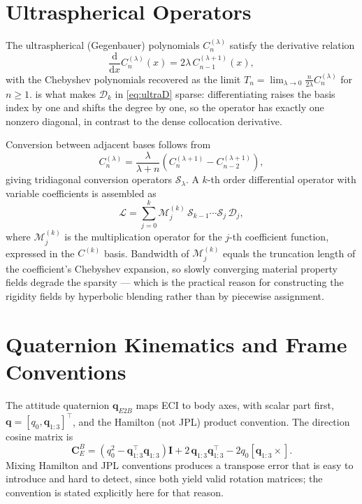 \documentclass[11pt,a4paper]{article}
\theoremstyle{definition}
\numberwithin{equation}{section}
\newcommand{\diff}{\mathrm{d}}
\begin{document}
\begin{appendices}

\section{Ultraspherical Operators}
\label{app:ultra}

The ultraspherical (Gegenbauer) polynomials $C_n^{(\lambda)}$ satisfy the derivative relation
\begin{equation}
\label{eq:ultraderiv}
\frac{\diff}{\diff x} C_n^{(\lambda)}(x) = 2\lambda\, C_{n-1}^{(\lambda+1)}(x),
\end{equation}
with the Chebyshev polynomials recovered as the limit $T_n = \lim_{\lambda \to 0}\tfrac{n}{2\lambda}C_n^{(\lambda)}$ for $n \ge 1$.  is what makes $\mathcal{D}_k$ in \cref{eq:ultraD} sparse: differentiating raises the basis index by one and shifts the degree by one, so the operator has exactly one nonzero diagonal, in contrast to the dense collocation derivative.

Conversion between adjacent bases follows from
\begin{equation}
\label{eq:conversion}
C_n^{(\lambda)} = \frac{\lambda}{\lambda+n}\left( C_n^{(\lambda+1)} - C_{n-2}^{(\lambda+1)} \right),
\end{equation}
giving tridiagonal conversion operators $\mathcal{S}_\lambda$. A $k$-th order differential operator with variable coefficients is assembled as
\begin{equation}
\label{eq:assembly}
\mathcal{L} = \sum_{j=0}^{k} \mathcal{M}_j^{(k)}\, \mathcal{S}_{k-1}\cdots\mathcal{S}_j\, \mathcal{D}_j,
\end{equation}
where $\mathcal{M}_j^{(k)}$ is the multiplication operator for the $j$-th coefficient function, expressed in the $C^{(k)}$ basis. Bandwidth of $\mathcal{M}_j^{(k)}$ equals the truncation length of the coefficient's Chebyshev expansion, so slowly converging material property fields degrade the sparsity --- which is the practical reason for constructing the rigidity fields by hyperbolic blending rather than by piecewise assignment.

\section{Quaternion Kinematics and Frame Conventions}
\label{app:quat}

The attitude quaternion $\mathbf{q}_{E2B}$ maps ECI to body axes, with scalar part first, $\mathbf{q} = [q_0, \bm{q}_{1:3}]^{\!\top}$, and the Hamilton (not JPL) product convention. The direction cosine matrix is
\begin{equation}
\label{eq:dcm}
\mathbf{C}_{E}^{B} = \left(q_0^2 - \bm{q}_{1:3}^{\!\top}\bm{q}_{1:3}\right)\mathbf{I}
+ 2\,\bm{q}_{1:3}\bm{q}_{1:3}^{\!\top}
- 2 q_0 \left[\bm{q}_{1:3}\times\right].
\end{equation}
Mixing Hamilton and JPL conventions produces a transpose error that is easy to introduce and hard to detect, since both yield valid rotation matrices; the convention is stated explicitly here for that reason.

\end{appendices}
\end{document}
